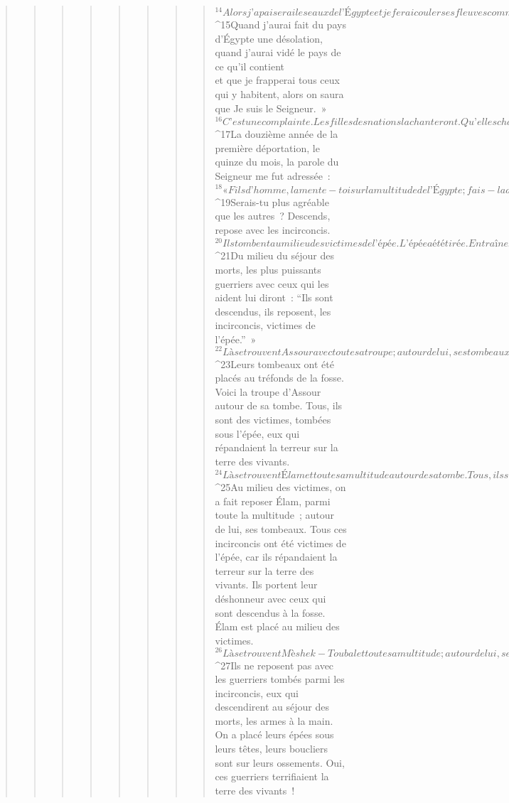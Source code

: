 \begin{verse}
\begin{verse}
\begin{verse}
\begin{verse}
\begin{verse}
\begin{verse}
\begin{verse}
\begin{verse}
${}^{14}Alors j’apaiserai les eaux de l’Égypte
        et je ferai couler ses fleuves comme de l’huile,
        – oracle du Seigneur Dieu.
${}^{15}Quand j’aurai fait du pays d’Égypte une désolation,
        quand j’aurai vidé le pays de ce qu’il contient
        \\et que je frapperai tous ceux qui y habitent,
        alors on saura que Je suis le Seigneur. »
${}^{16}C’est une complainte. Les filles des nations la chanteront. Qu’elles chantent cette complainte sur l’Égypte et sur toute sa multitude ! Oui, qu’elles chantent cette complainte – oracle du Seigneur Dieu.
       
${}^{17}La douzième année de la première déportation, le quinze du mois, la parole du Seigneur me fut adressée : 
${}^{18}« Fils d’homme, lamente-toi sur la multitude de l’Égypte ; fais-la descendre, elle et les filles des nations majestueuses, dans le pays des profondeurs avec ceux qui descendent à la fosse. 
${}^{19}Serais-tu plus agréable que les autres ? Descends, repose avec les incirconcis. 
${}^{20}Ils tombent au milieu des victimes de l’épée. L’épée a été tirée. Entraînez l’Égypte et toute sa multitude ! 
${}^{21}Du milieu du séjour des morts, les plus puissants guerriers avec ceux qui les aident lui diront : “Ils sont descendus, ils reposent, les incirconcis, victimes de l’épée.” »
       
${}^{22}Là se trouvent Assour avec toute sa troupe ; autour de lui, ses tombeaux. Tous, ils sont des victimes, tombées sous l’épée. 
${}^{23}Leurs tombeaux ont été placés au tréfonds de la fosse. Voici la troupe d’Assour autour de sa tombe. Tous, ils sont des victimes, tombées sous l’épée, eux qui répandaient la terreur sur la terre des vivants.
${}^{24}Là se trouvent Élam et toute sa multitude autour de sa tombe. Tous, ils sont des victimes, tombées sous l’épée. Ils sont descendus incirconcis au pays des profondeurs, eux qui répandaient la terreur sur la terre des vivants. Ils portent leur déshonneur avec ceux qui sont descendus à la fosse. 
${}^{25}Au milieu des victimes, on a fait reposer Élam, parmi toute la multitude ; autour de lui, ses tombeaux. Tous ces incirconcis ont été victimes de l’épée, car ils répandaient la terreur sur la terre des vivants. Ils portent leur déshonneur avec ceux qui sont descendus à la fosse. Élam est placé au milieu des victimes.
${}^{26}Là se trouvent Mèshek-Toubal et toute sa multitude ; autour de lui, ses tombeaux. Tous ces incirconcis ont été victimes de l’épée, car ils répandaient la terreur sur la terre des vivants. 
${}^{27}Ils ne reposent pas avec les guerriers tombés parmi les incirconcis, eux qui descendirent au séjour des morts, les armes à la main. On a placé leurs épées sous leurs têtes, leurs boucliers sont sur leurs ossements. Oui, ces guerriers terrifiaient la terre des vivants ! 

\end{verse}
\end{verse}
\end{verse}
\end{verse}
\end{verse}
\end{verse}
\end{verse}
\end{verse}
